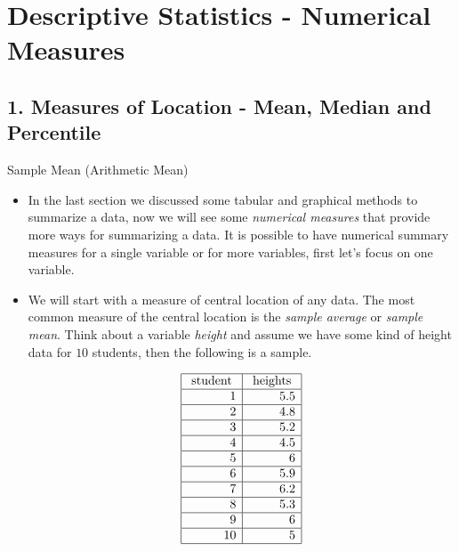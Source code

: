 \documentclass[8pt, usepdftitle=false]{beamer}
\begin{document}
\section{Descriptive Statistics - Numerical Measures}
\frame{\sectionpage}



\subsection{1. Measures of Location - Mean, Median and Percentile}
\frame{\subsectionpage}

\begin{frame}{Sample Mean (Arithmetic Mean)}


\begin{itemize}


\item In the last section we discussed some \alert{tabular} and \alert{graphical methods} to summarize a data, now we will see some \emph{numerical measures} that provide more ways for summarizing a data. It is possible to have numerical summary measures for a single variable or for more variables, first let's focus on one variable.

\item We will start with a measure of \alert{central location} of any data. The most common measure of the central location is the \emph{sample average} or \emph{sample mean}. Think about a variable \textit{height} and assume we have some kind of height data for $10$ students, then the following is a sample.

\begin{table}[H]
\begin{align*}
    \begin{array}{|r|r|}
    \hline
\text { student } & \text { heights } \\
\hline 1 & 5.5 \\
\hline 2 & 4.8 \\
\hline 3 & 5.2 \\
\hline 4 & 4.5 \\
\hline 5 & 6 \\
\hline 6 & 5.9 \\
\hline 7 & 6.2 \\
\hline 8 & 5.3 \\
\hline 9 & 6 \\
\hline 10 & 5 \\
\hline
\end{array}
\end{align*}

\end{table}

\end{itemize}





\end{frame}
\end{document}
